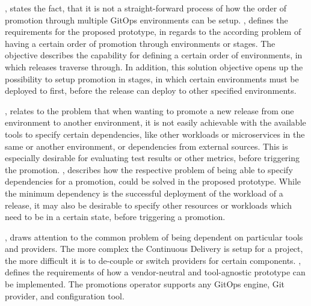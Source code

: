 \textit{},
states the fact, that it is not a straight-forward process of how the order of promotion
through multiple GitOps environments can be setup.
\textit{},
defines the requirements for the proposed prototype,
in regards to the according problem of having a certain order of promotion through environments or stages.
The objective describes the capability for defining a certain order of environments, in which releases traverse through.
In addition, this solution objective opens up the possibility to setup promotion in stages, in which
certain environments must be deployed to first, before the release can deploy to other specified environments.

\textit{},
relates to the problem that when wanting to promote a new release from one environment to another environment,
it is not easily achievable with the available tools to specify certain dependencies, like other workloads or
microservices in the same or another environment, or dependencies from external sources.
This is especially desirable for evaluating test results or other metrics, before triggering the promotion.
\textit{},
describes how the respective problem of being able to specify dependencies for a promotion,
could be solved in the proposed prototype. While the minimum dependency is the successful deployment
of the workload of a release,
it may also be desirable to specify other resources or workloads which need to be in a certain state,
before triggering a promotion.

\textit{},
draws attention to the common problem of being dependent on particular tools and providers.
The more complex the Continuous Delivery is setup for a project,
the more difficult it is to de-couple or switch providers for certain components.
\textit{},
defines the requirements of how a vendor-neutral and tool-agnostic prototype can be implemented.
The promotions operator supports any GitOps engine, Git provider, and configuration tool.

